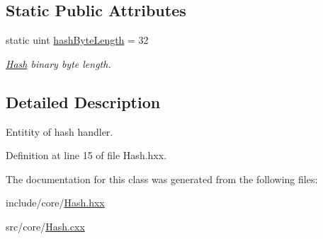 \subsection*{Static Public Attributes}
\begin{DoxyCompactItemize}
\item 
\mbox{\label{classeven_1_1_hash_aa38aa733e25101f2cc52d99573de0dbe}} 
static uint \mbox{\hyperlink{classeven_1_1_hash_aa38aa733e25101f2cc52d99573de0dbe}{hash\+Byte\+Length}} = 32
\begin{DoxyCompactList}\small\item\em \mbox{\hyperlink{classeven_1_1_hash}{Hash}} binary byte length. \end{DoxyCompactList}\end{DoxyCompactItemize}


\subsection{Detailed Description}
Entitity of hash handler. 

Definition at line 15 of file Hash.\+hxx.



The documentation for this class was generated from the following files\+:\begin{DoxyCompactItemize}
\item 
include/core/\mbox{\hyperlink{_hash_8hxx}{Hash.\+hxx}}\item 
src/core/\mbox{\hyperlink{_hash_8cxx}{Hash.\+cxx}}\end{DoxyCompactItemize}
